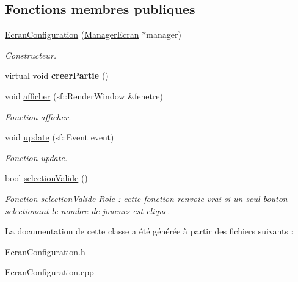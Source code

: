 \subsection*{\-Fonctions membres publiques}
\begin{DoxyCompactItemize}
\item 
\hypertarget{classEcranConfiguration_a40ba51dbd89594164d32ba0dbff817f2}{\hyperlink{classEcranConfiguration_a40ba51dbd89594164d32ba0dbff817f2}{\-Ecran\-Configuration} (\hyperlink{classManagerEcran}{\-Manager\-Ecran} $\ast$manager)}\label{classEcranConfiguration_a40ba51dbd89594164d32ba0dbff817f2}

\begin{DoxyCompactList}\small\item\em \-Constructeur. \end{DoxyCompactList}\item 
\hypertarget{classEcranConfiguration_aa65dbd2aca4c0b3853aea5eb8c92b98f}{virtual void {\bfseries creer\-Partie} ()}\label{classEcranConfiguration_aa65dbd2aca4c0b3853aea5eb8c92b98f}

\item 
\hypertarget{classEcranConfiguration_ab1a7fd161795e7dd28e359f5b8bb25f7}{void \hyperlink{classEcranConfiguration_ab1a7fd161795e7dd28e359f5b8bb25f7}{afficher} (sf\-::\-Render\-Window \&fenetre)}\label{classEcranConfiguration_ab1a7fd161795e7dd28e359f5b8bb25f7}

\begin{DoxyCompactList}\small\item\em \-Fonction afficher. \end{DoxyCompactList}\item 
\hypertarget{classEcranConfiguration_af6827f55a832c0ea0b8e580e68fc7503}{void \hyperlink{classEcranConfiguration_af6827f55a832c0ea0b8e580e68fc7503}{update} (sf\-::\-Event event)}\label{classEcranConfiguration_af6827f55a832c0ea0b8e580e68fc7503}

\begin{DoxyCompactList}\small\item\em \-Fonction update. \end{DoxyCompactList}\item 
\hypertarget{classEcranConfiguration_a72a91a3f504c3047694e06c826c7ee7d}{bool \hyperlink{classEcranConfiguration_a72a91a3f504c3047694e06c826c7ee7d}{selection\-Valide} ()}\label{classEcranConfiguration_a72a91a3f504c3047694e06c826c7ee7d}

\begin{DoxyCompactList}\small\item\em \-Fonction selection\-Valide \-Role \-: cette fonction renvoie vrai si un seul bouton selectionant le nombre de joueurs est clique. \end{DoxyCompactList}\end{DoxyCompactItemize}


\-La documentation de cette classe a été générée à partir des fichiers suivants \-:\begin{DoxyCompactItemize}
\item 
\-Ecran\-Configuration.\-h\item 
\-Ecran\-Configuration.\-cpp\end{DoxyCompactItemize}
